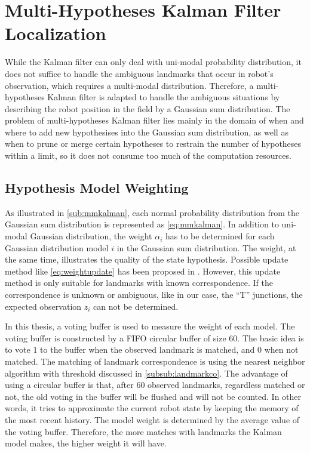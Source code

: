 \chapter{Multi-Hypotheses Kalman Filter Localization\label{cha:chapter5}}
While the Kalman filter can only deal with uni-modal probability distribution, it does not suffice to handle the ambiguous landmarks that occur in robot's observation, which requires a multi-modal distribution. Therefore, a multi-hypotheses Kalman filter is adapted to handle the ambiguous situations by describing the robot position in the field by a Gaussian sum distribution.
The problem of multi-hypotheses Kalman filter lies mainly in the domain of when and where to add new hypothesises into the Gaussian sum distribution, as well as when to prune or merge certain hypotheses to restrain the number of hypotheses within a limit, so it does not consume too much of the computation resources.


\section{Hypothesis Model Weighting}
As illustrated in \autoref{sub:mmkalman}, each normal probability distribution from the Gaussian sum distribution is represented as \autoref{eq:mmkalman}. In addition to uni-modal Gaussian distribution, the weight $\alpha_i$ has to be determined for each Gaussian distribution model $i$ in the Gaussian sum distribution. The weight, at the same time, illustrates the quality of the state hypothesis. Possible update method like \autoref{eq:weightupdate} has been proposed in \cite{alspach1972nonlinear}. However, this update method is only suitable for landmarks with known correspondence. If the correspondence is unknown or ambiguous, like in our case, the ``T'' junctions, the expected observation $z\widehat{}_i$ can not be determined. 

In this thesis, a voting buffer is used to measure the weight of each model. The voting buffer is constructed by a \gls{FIFO} circular buffer of size $60$. The basic idea is to vote $1$ to the buffer when the observed landmark is matched, and $0$ when not matched. The matching of landmark correspondence is using the nearest neighbor algorithm with threshold discussed in \autoref{subsub:landmarkco}. 
The advantage of using a circular buffer is that, after $60$ observed landmarks, regardless matched or not, the old voting in the buffer will be flushed and will not be counted. In other words, it tries to approximate the current robot state by keeping the memory of the most recent history. The model weight is determined by the average value of the voting buffer. Therefore, the more matches with landmarks the Kalman model makes, the higher weight it will have. 

